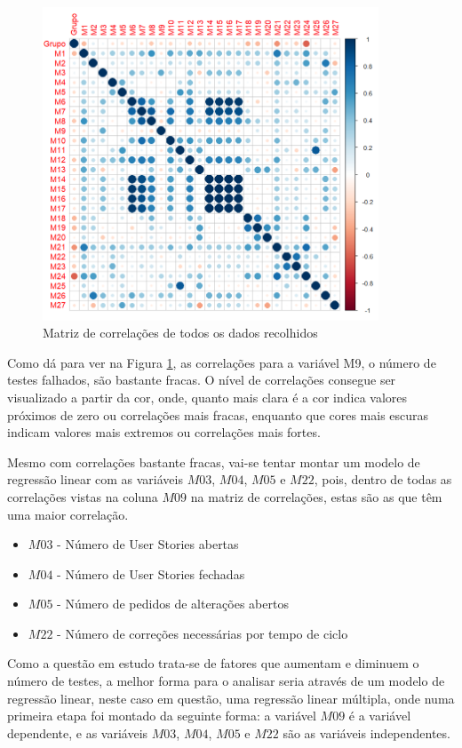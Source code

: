 \documentclass[%
 aip,
cp,  %
 amsmath,amssymb,%
 reprint,%
]{revtex4-2}
\begin{document}
\begin{figure}[!h]
    \centering
    \includegraphics[width=10cm]{imagens/questao3/questao3_matriz de correlacoes.png}
    \caption{Matriz de correlações de todos os dados recolhidos}
    \label{questao3matrizDeCorrelacoes}
\end{figure}

Como dá para ver na Figura \ref{questao3matrizDeCorrelacoes}, as correlações para a variável M9, o número de testes falhados, são bastante fracas. O nível de correlações consegue ser visualizado a partir da cor, onde, quanto mais clara é a cor indica valores próximos de zero ou correlações mais fracas, enquanto que cores mais escuras indicam valores mais extremos ou correlações mais fortes.


Mesmo com correlações bastante fracas, vai-se tentar montar um modelo de regressão linear com as variáveis $M03$, $M04$, $M05$ e $M22$, pois, dentro de todas as correlações vistas na coluna $M09$ na matriz de correlações, estas são as que têm uma maior correlação.

\begin{itemize}
    \item $M03$ - Número de User Stories abertas 
    \item $M04$ - Número de User Stories fechadas 
    \item $M05$ - Número de pedidos de alterações abertos
    \item $M22$ - Número de correções necessárias por tempo de ciclo
\end{itemize}

Como a questão em estudo trata-se de fatores que aumentam e diminuem o número de testes, a melhor forma para o analisar seria através de um modelo de regressão linear, neste caso em questão, uma regressão linear múltipla, onde numa primeira etapa foi montado da seguinte forma: a variável $M09$ é a variável dependente, e as variáveis $M03$, $M04$, $M05$ e $M22$ são as variáveis independentes.\\
\end{document}
